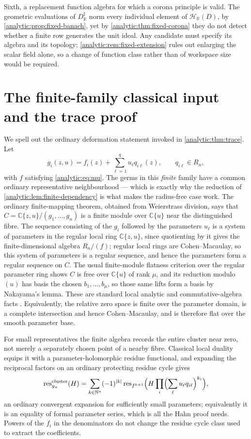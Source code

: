 \documentclass[11pt,letterpaper]{article}
\theoremstyle{definition}
\theoremstyle{remark}
\newcommand{\C}{\mathbb C}
\newcommand{\R}{\mathbb R}
\newcommand{\N}{\mathbb N}
\newcommand{\HH}{\mathcal H}
\newcommand{\res}{\operatorname{res}}
\numberwithin{equation}{section}
\begin{document}
Sixth, a replacement function algebra for which a corona principle is
valid. The geometric evaluations of $D^\sharp_\R$ norm every individual
element of $\HH_\R(D)$, by \cref{analytic:prop:fixed-banach}, yet by
\cref{analytic:thm:fixed-corona} they do not detect whether a finite row
generates the unit ideal. Any candidate must specify its algebra and its
topology; \cref{analytic:rem:fixed-extension} rules out enlarging the
scalar field alone, so a change of function class rather than of workspace
size would be required.

\appendix
\section{The finite-family classical input and the trace proof}
\label{analytic:app:classical-family}

We spell out the ordinary deformation statement invoked in
\cref{analytic:thm:trace}. Let
\[
 g_i(z,u)=f_i(z)+\sum_{\ell=1}^qu_\ell q_{i\ell}(z),
 \qquad q_{i\ell}\in R_n,
\]
with $f$ satisfying \eqref{analytic:eq:mu}. The germs in this \emph{finite}
family have a common ordinary representative neighbourhood --- which is
exactly why the reduction of \cref{analytic:lem:finite-dependency} is what
makes the radius-free case work. The ordinary finite-mapping theorem,
obtained from Weierstrass division, says that
$C=\C\{z,u\}/(g_1,\ldots,g_n)$ is a finite module over $\C\{u\}$ near the
distinguished fibre. The sequence consisting of the $g_i$ followed by the
parameters $u_\ell$ is a system of parameters in the regular local ring
$\C\{z,u\}$, since quotienting by it gives the finite-dimensional algebra
$R_n/(f)$; regular local rings are Cohen--Macaulay, so this system of
parameters is a regular sequence, and hence the parameters form a regular
sequence on $C$. The usual finite-module flatness criterion over the regular
parameter ring shows $C$ is free over $\C\{u\}$ of rank $\mu$, and its
reduction modulo $(u)$ has basis the chosen $b_1,\ldots,b_\mu$, so those
same lifts form a basis by Nakayama's lemma. These are standard local
analytic and commutative-algebra facts
\cite{GrauertRemmert,GunningRossi,Stacks}. Equivalently, the relative zero
space is finite over the parameter domain, is a complete intersection and
hence Cohen--Macaulay, and is therefore flat over the smooth parameter base.

For small representatives the finite algebra records the entire cluster near
zero, not merely a separately chosen point of a nearby fibre. Classical
local duality equips it with a parameter-holomorphic residue functional, and
expanding the reciprocal factors on an ordinary protecting residue cycle
gives
\[
 \res^{\mathrm{cluster}}_{g_u}(H)
 =\sum_{k\in\N^n}(-1)^{|k|}\res_{f^{k+1}}
 \Bigl(H\prod_i\Bigl(\sum_\ell u_\ell q_{i\ell}\Bigr)^{k_i}\Bigr),
\]
an ordinary convergent expansion for sufficiently small parameters;
equivalently it is an equality of formal parameter series, which is all the
Hahn proof needs. Powers of the $f_i$ in the denominators do not change the
residue cycle class used to extract the coefficients.
\end{document}
